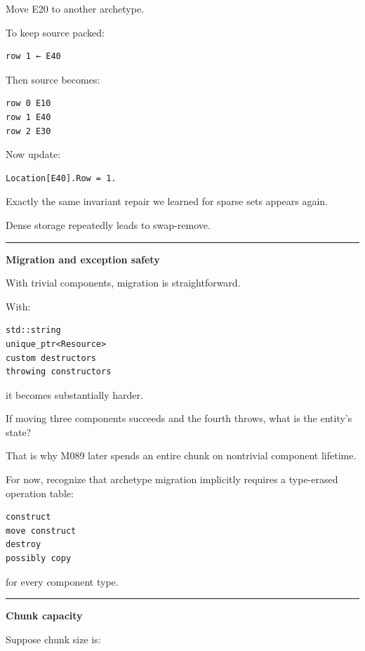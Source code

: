 Move E20 to another archetype.

To keep source packed:

\begin{verbatim}
row 1 ← E40
\end{verbatim}

Then source becomes:

\begin{verbatim}
row 0 E10
row 1 E40
row 2 E30
\end{verbatim}

Now update:

\begin{verbatim}
Location[E40].Row = 1.
\end{verbatim}

Exactly the same invariant repair we learned for sparse sets appears again.

Dense storage repeatedly leads to swap-remove.

\begin{center}\rule{0.5\linewidth}{0.5pt}\end{center}

\textbf{Migration and exception safety}

With trivial components, migration is straightforward.

With:

\begin{verbatim}
std::string
unique_ptr<Resource>
custom destructors
throwing constructors
\end{verbatim}

it becomes substantially harder.

If moving three components succeeds and the fourth throws, what is the entity's state?

That is why M089 later spends an entire chunk on nontrivial component lifetime.

For now, recognize that archetype migration implicitly requires a type-erased operation table:

\begin{verbatim}
construct
move construct
destroy
possibly copy
\end{verbatim}

for every component type.

\begin{center}\rule{0.5\linewidth}{0.5pt}\end{center}

\textbf{Chunk capacity}

Suppose chunk size is:

